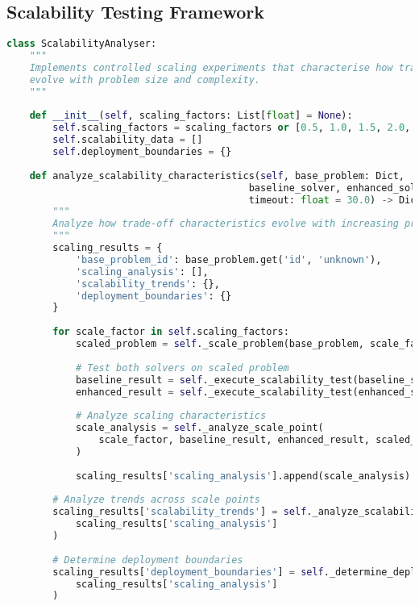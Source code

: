 \subsection{Scalability Testing Framework}
\label{appendix:scalability-testing}

\begin{lstlisting}[language=Python, caption=Scalability Analysis and Deployment Boundary Assessment]
class ScalabilityAnalyser:
    """
    Implements controlled scaling experiments that characterise how trade-off ratios 
    evolve with problem size and complexity.
    """
    
    def __init__(self, scaling_factors: List[float] = None):
        self.scaling_factors = scaling_factors or [0.5, 1.0, 1.5, 2.0, 2.5]
        self.scalability_data = []
        self.deployment_boundaries = {}
    
    def analyze_scalability_characteristics(self, base_problem: Dict, 
                                          baseline_solver, enhanced_solver,
                                          timeout: float = 30.0) -> Dict:
        """
        Analyze how trade-off characteristics evolve with increasing problem scale.
        """
        scaling_results = {
            'base_problem_id': base_problem.get('id', 'unknown'),
            'scaling_analysis': [],
            'scalability_trends': {},
            'deployment_boundaries': {}
        }
        
        for scale_factor in self.scaling_factors:
            scaled_problem = self._scale_problem(base_problem, scale_factor)
            
            # Test both solvers on scaled problem
            baseline_result = self._execute_scalability_test(baseline_solver, scaled_problem, timeout)
            enhanced_result = self._execute_scalability_test(enhanced_solver, scaled_problem, timeout)
            
            # Analyze scaling characteristics
            scale_analysis = self._analyze_scale_point(
                scale_factor, baseline_result, enhanced_result, scaled_problem
            )
            
            scaling_results['scaling_analysis'].append(scale_analysis)
        
        # Analyze trends across scale points
        scaling_results['scalability_trends'] = self._analyze_scalability_trends(
            scaling_results['scaling_analysis']
        )
        
        # Determine deployment boundaries
        scaling_results['deployment_boundaries'] = self._determine_deployment_boundaries(
            scaling_results['scaling_analysis']
        )
        

\end{lstlisting}
